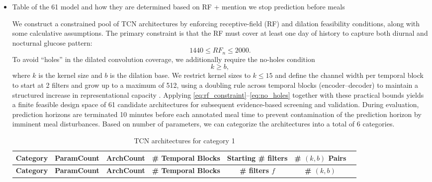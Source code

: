 \documentclass[preprint,12pt]{elsarticle}
\begin{document}
\begin{itemize}
    \item Table of the 61 model and how they are determined based on RF + mention we stop prediction before meals

We construct a constrained pool of TCN architectures by enforcing receptive-field (RF) and dilation feasibility conditions, along with some calculative assumptions. The primary constraint is that the RF must cover at least one day of history to capture both diurnal and nocturnal glucose pattern:
\begin{equation}
1440 \le RF_n \le 2000 .
\label{eq:rf_constraint}
\end{equation}
To avoid ``holes'' in the dilated convolution coverage, we additionally require the no-holes condition
\begin{equation}
k \ge b ,
\label{eq:no_holes}
\end{equation}
where $k$ is the kernel size and $b$ is the dilation base. We restrict kernel sizes to $k \le 15$ and define the channel width per temporal block to start at 2 filters and grow up to a maximum of 512, using a doubling rule across temporal blocks (encoder--decoder) to maintain a structured increase in representational capacity \cite{ronneberger2015u} \cite{badrinarayanan2017segnet}.
Applying \eqref{eq:rf_constraint}--\eqref{eq:no_holes} together with these practical bounds yields a finite feasible design space of 61 candidate architectures for subsequent evidence-based screening and validation. During evaluation, prediction horizons are terminated 10 minutes before each annotated meal time to prevent contamination of the prediction horizon by imminent meal disturbances.
\noindent
Based on number of parameters, we can categorize the architectures into a total of 6 categories. 


\begin{footnotesize}
\setlength{\tabcolsep}{6pt}
\begin{longtable}{ccccccc}
\caption{TCN architectures for category 1}
\label{tab:cat1}\\
\toprule
\textbf{Category} & \textbf{ParamCount}& \textbf{ArchCount} & \textbf{\# Temporal Blocks} & \textbf{Starting \# filters} & \textbf{\# $(k, b)$ Pairs} \\
\midrule
\endfirsthead

\toprule
\textbf{Category} & \textbf{ParamCount}& \textbf{ArchCount} & \textbf{\# Temporal Blocks} & \textbf{\# filters $f$} & \textbf{\# $(k, b)$} \\
\midrule
\endhead


\end{longtable}
\end{footnotesize}
\end{itemize}
\end{document}
